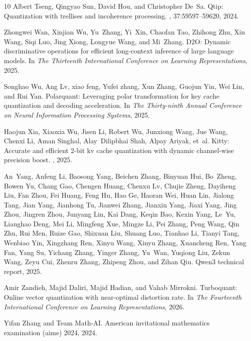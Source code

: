 \documentclass{llmxive}
\begin{document}
\begin{thebibliography}{10}
Albert Tseng, Qingyao Sun, David Hou, and Christopher De~Sa.
\newblock Qtip: Quantization with trellises and incoherence processing.
, 37:59597--59620, 2024.

Zhongwei Wan, Xinjian Wu, Yu~Zhang, Yi~Xin, Chaofan Tao, Zhihong Zhu, Xin Wang, Siqi Luo, Jing Xiong, Longyue Wang, and Mi~Zhang.
\newblock $\text{D2O}$: Dynamic discriminative operations for efficient long-context inference of large language models.
\newblock In {\em The Thirteenth International Conference on Learning Representations}, 2025.

Songhao Wu, Ang Lv, xiao feng, Yufei zhang, Xun Zhang, Guojun Yin, Wei Lin, and Rui Yan.
\newblock Polarquant: Leveraging polar transformation for key cache quantization and decoding acceleration.
\newblock In {\em The Thirty-ninth Annual Conference on Neural Information Processing Systems}, 2025.

Haojun Xia, Xiaoxia Wu, Jisen Li, Robert Wu, Junxiong Wang, Jue Wang, Chenxi Li, Aman Singhal, Alay~Dilipbhai Shah, Alpay Ariyak, et~al.
\newblock Kitty: Accurate and efficient 2-bit kv cache quantization with dynamic channel-wise precision boost.
, 2025.

An~Yang, Anfeng Li, Baosong Yang, Beichen Zhang, Binyuan Hui, Bo~Zheng, Bowen Yu, Chang Gao, Chengen Huang, Chenxu Lv, Chujie Zheng, Dayiheng Liu, Fan Zhou, Fei Huang, Feng Hu, Hao Ge, Haoran Wei, Huan Lin, Jialong Tang, Jian Yang, Jianhong Tu, Jianwei Zhang, Jianxin Yang, Jiaxi Yang, Jing Zhou, Jingren Zhou, Junyang Lin, Kai Dang, Keqin Bao, Kexin Yang, Le~Yu, Lianghao Deng, Mei Li, Mingfeng Xue, Mingze Li, Pei Zhang, Peng Wang, Qin Zhu, Rui Men, Ruize Gao, Shixuan Liu, Shuang Luo, Tianhao Li, Tianyi Tang, Wenbiao Yin, Xingzhang Ren, Xinyu Wang, Xinyu Zhang, Xuancheng Ren, Yang Fan, Yang Su, Yichang Zhang, Yinger Zhang, Yu~Wan, Yuqiong Liu, Zekun Wang, Zeyu Cui, Zhenru Zhang, Zhipeng Zhou, and Zihan Qiu.
\newblock Qwen3 technical report, 2025.

Amir Zandieh, Majid Daliri, Majid Hadian, and Vahab Mirrokni.
\newblock Turboquant: Online vector quantization with near-optimal distortion rate.
\newblock In {\em The Fourteenth International Conference on Learning Representations}, 2026.

Yifan Zhang and Team Math-AI.
\newblock American invitational mathematics examination (aime) 2024, 2024.


\end{thebibliography}
\end{document}
